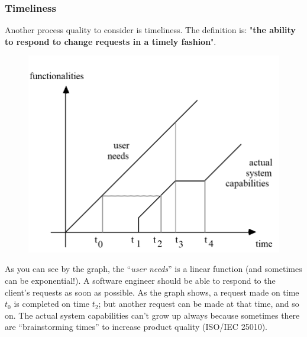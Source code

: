 \documentclass[a4paper]{article}
\newcommand{\dquotes}[1]{``#1''}
\begin{document}
    \newpage

    \subsubsection{Timeliness}

    Another process quality to consider is timeliness. The definition is: "\textbf{the ability to respond to change requests in a timely fashion}".
    \begin{figure}[!htp]
        \centering
        \includegraphics[width=.8\textwidth]{img/timeliness-1.png}
    \end{figure}

    \noindent
    As you can see by the graph, the \dquotes{\emph{user needs}} is a linear function (and sometimes can be exponential!). A software engineer should be able to respond to the client's requests as soon as possible. As the graph shows, a request made on time $t_{0}$ is completed on time $t_{2}$; but another request can be made at that time, and so on. The actual system capabilities can't grow up always because sometimes there are \dquotes{brainstorming times} to increase product quality (ISO/IEC 25010).

    \newpage

    {}
    

    \newpage

    \printindex
\end{document}
